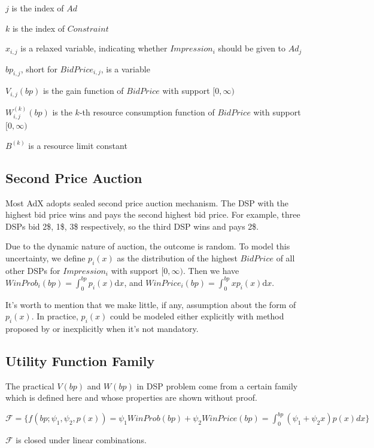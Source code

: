 \documentclass[sigconf]{acmart}
\newcommand{\sx}{x_{i,j}}
\newcommand{\sbp}{bp_{i,j}}
\newcommand{\sV}{V_{i,j}}
\newcommand{\sW}{W_{i,j}^{(k)}}
\newcommand{\sB}{B^{(k)}}
\newcommand{\pprob}{\psi_1}
\newcommand{\pprice}{\psi_2}
\newcommand{\uff}{\mathscr{F}}
\newcommand{\uf}{f(bp; \pprob, \pprice, p(x))}
\begin{document}
$j$ is the index of $Ad$

$k$ is the index of $Constraint$

$\sx$ is a relaxed variable, indicating whether $Impression_i$ should be given to $Ad_j$

$\sbp$, short for $BidPrice_{i,j}$, is a variable

$\sV(bp)$ is the gain function of $BidPrice$ with support $[0, \infty)$

$\sW(bp)$ is the $k$-th resource consumption function of $BidPrice$ with support $[0, \infty)$

$\sB$ is a resource limit constant

\subsection{Second Price Auction}

Most AdX adopts sealed second price auction mechanism.
The DSP with the highest bid price wins and pays the second highest bid price.
For example, three DSPs bid 2\$, 1\$, 3\$ respectively, so the third DSP wins and pays 2\$. 

Due to the dynamic nature of auction, the outcome is random.
To model this uncertainty, we define $p_i(x)$ as
   the distribution of the highest $BidPrice$ of all other DSPs for $Impression_i$ with support $[0, \infty)$.
Then we have $WinProb_i(bp)=\int_0^{bp} p_i(x) \mathrm{d} x$, and $WinPrice_i(bp)=\int_0^{bp} x p_i(x) \mathrm{d} x$.

It's worth to mention that we make little, if any, assumption about the form of $p_i(x)$.
In practice, $p_i(x)$ could be modeled either explicitly with method proposed by \cite{Wu2015} or inexplicitly when it's not mandatory.

\subsection{Utility Function Family}

The practical $V(bp)$ and $W(bp)$ in DSP problem come from a certain family
    which is defined here and whose properties are shown without proof.

\begin{definition}
$\uff = \{ \uf = \pprob WinProb(bp) + \pprice WinPrice(bp) = \int_0^{bp} (\pprob + \pprice x)p(x)dx \} $
\end{definition}

\begin{theorem}
$\uff$ is closed under linear combinations.
\end{theorem}
\end{document}
